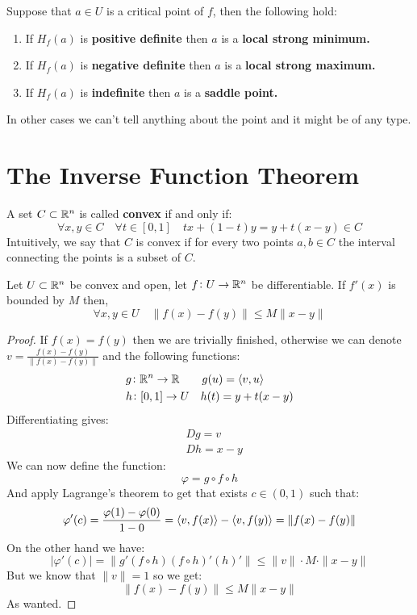 \documentclass[11pt,a4paper]{article}
\begin{document}
	\newpage
	
	Suppose that $a \in U$ is a critical point of $f$, then the following
	hold:
	\begin{enumerate}
		\item If $H_f(a)$ is \textbf{positive definite} then $a$ is a 
		\textbf{local strong minimum.}
		\item If $H_f(a)$ is \textbf{negative definite} then $a$ is a 
		\textbf{local strong maximum.}
		\item If $H_f(a)$ is \textbf{indefinite} then $a$ is a 
		\textbf{saddle point.}
	\end{enumerate}
	In other cases we can't tell anything about the point and it might be
	of any type.

	\newpage
	
	\section{The Inverse Function Theorem}
	A set $C \subset \mathbb{R}^n$ is called \textbf{convex} if and only if:
	\[
		\forall x,y \in C \quad \forall t \in [0,1] \quad
		tx + (1-t)y = y + t(x-y) \in C
	\]
	Intuitively, we say that $C$ is convex if for every two points $a,b \in C$
	the interval connecting the points is a subset of $C$.
	\begin{proposition}
		Let $U \subset \mathbb{R}^n$ be convex and open, let $f \colon U \to \mathbb{R}^n$
		be differentiable. If $f'(x)$ is bounded by $M$ then,
		\[
			 \forall x,y \in U \quad \|f(x) - f(y)\| \le M\|x - y\|
		\]
	\end{proposition}
	\begin{proof}
		If $f(x) = f(y)$ then we are trivially finished, otherwise we can
		denote $v = \frac{f(x) - f(y)}{\|f(x) - f(y)\|}$ and the following
		functions:
		\begin{align*}
			&g \colon \mathbb{R}^n \to \mathbb{R} \quad \quad g(u) = \langle v, u \rangle \\
			&h \colon [0,1] \to U \quad h(t) = y + t(x-y)
		\end{align*}
		Differentiating gives:
		\begin{align*}
			&Dg = v \\
			&Dh = x-y
		\end{align*}
	We can now define the function:
	\[
		\varphi = g \circ f \circ h
	\]
	And apply Lagrange's theorem to get that exists $c \in (0,1)$ such that:
	\[
		\varphi'(c) = \frac{\varphi(1) - \varphi(0)}{1 - 0} = 
		\langle v, f(x) \rangle - \langle v, f(y) \rangle = \|f(x) - f(y)\|
	\]
	On the other hand we have:
	\[
		|\varphi'(c)| = \|g'(f \circ h)(f \circ h)'(h)'\| \le 
		\|v\| \cdot M \cdot \|x - y\|
	\]
	But we know that $\|v\| = 1$ so we get:
	\[
		\|f(x) - f(y)\| \le M\|x - y\|
	\]
	As wanted.
	\end{proof}
\end{document}
